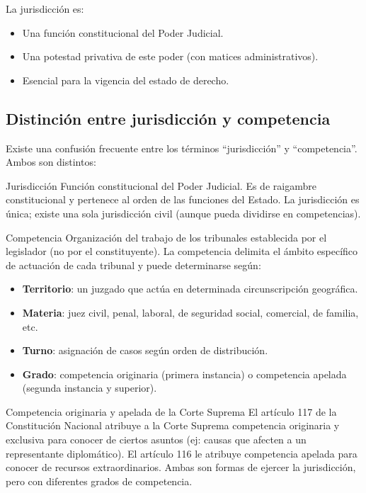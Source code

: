 \documentclass[12pt,oneside]{book}
\begin{document}
La jurisdicción es:

\begin{itemize}
    \item Una función constitucional del Poder Judicial.
    \item Una potestad privativa de este poder (con matices administrativos).
    \item Esencial para la vigencia del estado de derecho.
\end{itemize}

\subsection{Distinción entre jurisdicción y competencia}

Existe una confusión frecuente entre los términos ``jurisdicción'' y ``competencia''. Ambos son distintos:

\begin{definition}{Jurisdicción}
Función constitucional del Poder Judicial. Es de raigambre constitucional y pertenece al orden de las funciones del Estado. La jurisdicción es única; existe una sola jurisdicción civil (aunque pueda dividirse en competencias).
\end{definition}

\begin{definition}{Competencia}
Organización del trabajo de los tribunales establecida por el legislador (no por el constituyente). La competencia delimita el ámbito específico de actuación de cada tribunal y puede determinarse según:
\begin{itemize}
    \item \textbf{Territorio}: un juzgado que actúa en determinada circunscripción geográfica.
    \item \textbf{Materia}: juez civil, penal, laboral, de seguridad social, comercial, de familia, etc.
    \item \textbf{Turno}: asignación de casos según orden de distribución.
    \item \textbf{Grado}: competencia originaria (primera instancia) o competencia apelada (segunda instancia y superior).
\end{itemize}
\end{definition}

\begin{example}{Competencia originaria y apelada de la Corte Suprema}
El artículo 117 de la Constitución Nacional atribuye a la Corte Suprema competencia originaria y exclusiva para conocer de ciertos asuntos (ej: causas que afecten a un representante diplomático). El artículo 116 le atribuye competencia apelada para conocer de recursos extraordinarios. Ambas son formas de ejercer la jurisdicción, pero con diferentes grados de competencia.
\end{example}
\end{document}
